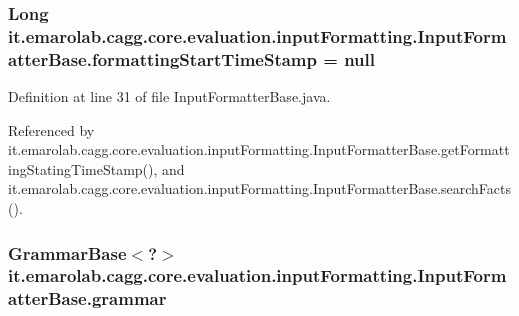\hypertarget{classit_1_1emarolab_1_1cagg_1_1core_1_1evaluation_1_1inputFormatting_1_1InputFormatterBase_aea9730062293893aefe4e81c5e2ecedd}{
\subsubsection[{formatting\-Start\-Time\-Stamp}]{\setlength{\rightskip}{0pt plus 5cm}Long it.\-emarolab.\-cagg.\-core.\-evaluation.\-input\-Formatting.\-Input\-Formatter\-Base.\-formatting\-Start\-Time\-Stamp = null\hspace{0.3cm}{\ttfamily [private]}}}\label{classit_1_1emarolab_1_1cagg_1_1core_1_1evaluation_1_1inputFormatting_1_1InputFormatterBase_aea9730062293893aefe4e81c5e2ecedd}


Definition at line 31 of file Input\-Formatter\-Base.\-java.



Referenced by it.\-emarolab.\-cagg.\-core.\-evaluation.\-input\-Formatting.\-Input\-Formatter\-Base.\-get\-Formatting\-Stating\-Time\-Stamp(), and it.\-emarolab.\-cagg.\-core.\-evaluation.\-input\-Formatting.\-Input\-Formatter\-Base.\-search\-Facts().

\hypertarget{classit_1_1emarolab_1_1cagg_1_1core_1_1evaluation_1_1inputFormatting_1_1InputFormatterBase_a3de6c039296a18f821706f1b8e0cb2a5}{
\subsubsection[{grammar}]{\setlength{\rightskip}{0pt plus 5cm}Grammar\-Base$<$?$>$ it.\-emarolab.\-cagg.\-core.\-evaluation.\-input\-Formatting.\-Input\-Formatter\-Base.\-grammar\hspace{0.3cm}{\ttfamily [private]}}}\label{classit_1_1emarolab_1_1cagg_1_1core_1_1evaluation_1_1inputFormatting_1_1InputFormatterBase_a3de6c039296a18f821706f1b8e0cb2a5}


